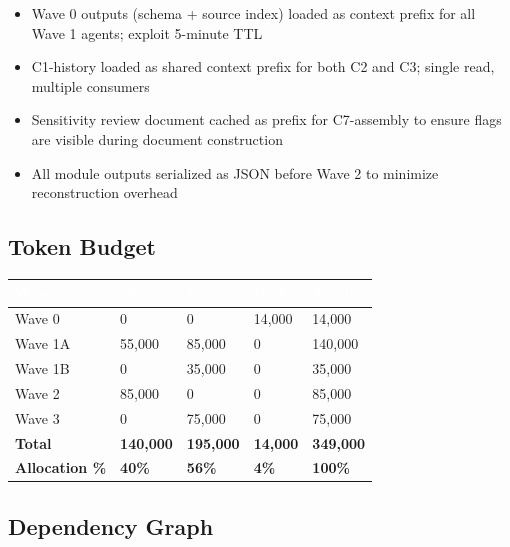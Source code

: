 \documentclass[11pt,letterpaper]{article}
\newcommand{\tableheader}[1]{\textbf{\sffamily\textcolor{white}{#1}}}
\begin{document}
\begin{itemize}[nosep]
  \item Wave 0 outputs (schema + source index) loaded as context prefix for all Wave 1 agents; exploit 5-minute TTL
  \item C1-history loaded as shared context prefix for both C2 and C3; single read, multiple consumers
  \item Sensitivity review document cached as prefix for C7-assembly to ensure flags are visible during document construction
  \item All module outputs serialized as JSON before Wave 2 to minimize reconstruction overhead
\end{itemize}

\subsection{Token Budget}

\begin{center}
\begin{tabularx}{\textwidth}{L{3cm}C{2cm}C{2cm}C{2cm}C{2cm}}
\toprule
{}
\tableheader{Wave} & \tableheader{Opus} & \tableheader{Sonnet} & \tableheader{Haiku} & \tableheader{Total} \\
\midrule
Wave 0 & 0 & 0 & 14,000 & 14,000 \\
Wave 1A & 55,000 & 85,000 & 0 & 140,000 \\
Wave 1B & 0 & 35,000 & 0 & 35,000 \\
Wave 2 & 85,000 & 0 & 0 & 85,000 \\
Wave 3 & 0 & 75,000 & 0 & 75,000 \\
\midrule
\textbf{Total} & \textbf{140,000} & \textbf{195,000} & \textbf{14,000} & \textbf{349,000} \\
\textbf{Allocation \%} & \textbf{40\%} & \textbf{56\%} & \textbf{4\%} & \textbf{100\%} \\
\bottomrule
\end{tabularx}
\end{center}

\subsection{Dependency Graph}
\end{document}

